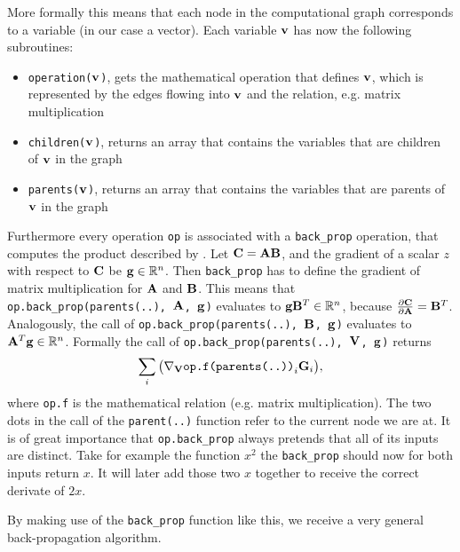 More formally this means that each node in the computational graph corresponds to a variable (in our case a vector).
Each variable \(\mathbf{v}\) has now the following subroutines:
\begin{itemize}
    \item \texttt{operation(\(\mathbf{v}\))}, gets the mathematical operation that defines \(\mathbf{v}\),
    which is represented by the edges flowing into \(\mathbf{v}\) and the relation, e.g. matrix multiplication
    \item \texttt{children(\(\mathbf{v}\))}, returns an array that contains the variables that are children of \(\mathbf{v}\) in the graph
    \item \texttt{parents(\(\mathbf{v}\))}, returns an array that contains the variables that are parents of \(\mathbf{v}\) in the graph 
\end{itemize}
Furthermore every operation \texttt{op} is associated with a \texttt{back\_prop} operation, that computes the product described by .
Let \(\mathbf{C} = \mathbf{AB}\), and the gradient of a scalar \(z\) with respect to \(\mathbf{C}\) be \(\mathbf{g} \in \mathbb{R}^n\).
Then \texttt{back\_prop} has to define the gradient of matrix multiplication for \(\mathbf{A}\) and \(\mathbf{B}\).
This means that \texttt{op.back\_prop(parents(..), \(\mathbf{A}\), \(\mathbf{g}\))} evaluates to \(\mathbf{g}\mathbf{B}^T \in \mathbb{R}^n\), because \(\frac{\partial \mathbf{C}}{\partial \mathbf{A}} = \mathbf{B}^T\).
Analogously, the call of \texttt{op.back\_prop(parents(..), \(\mathbf{B}\), \(\mathbf{g}\))} evaluates to \(\mathbf{A}^T\mathbf{g} \in \mathbb{R}^n\).
Formally the call of \texttt{op.back\_prop(parents(..), \(\mathbf{V}\), \(\mathbf{g}\))} returns
\begin{equation}
    \sum_{i} \big( \nabla_{\mathbf{V}} \texttt{op.f(parents(..))}_{i} \mathbf{G}_{i} \big),
\end{equation}
where \texttt{op.f} is the mathematical relation (e.g. matrix multiplication).
The two dots in the call of the \texttt{parent(..)} function refer to the current node we are at.
It is of great importance that \texttt{op.back\_prop} always pretends that all of its inputs are distinct.
Take for example the function \(x^2\) the \texttt{back\_prop} should now for both inputs return \(x\).
It will later add those two \(x\) together to receive the correct derivate of \(2x\).

By making use of the \texttt{back\_prop} function like this, we receive a very general back-propagation algorithm. \\

